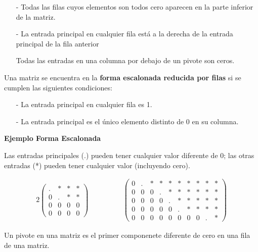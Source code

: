\documentclass{article}
\begin{document}
\begin{tcolorbox}[colback=blue!10!white,colframe=blue!60!black,title=Propiedades de la Forma Escalonada]
    \begin{itemize}
        \item[-] Todas las filas cuyos elementos son todos cero aparecen en la parte inferior de la matriz.
        \item[-] La entrada principal en cualquier fila está a la derecha de la entrada principal de la fila anterior
        \item[] Todas las entradas en una columna por debajo de un pivote son ceros.
    \end{itemize}   
    Una matriz se encuentra en la \textbf{forma escalonada reducida por filas} si se cumplen las siguientes condiciones:
    \begin{itemize}
        \item[-] La entrada principal en cualquier fila es 1.
        \item[-] La entrada principal es el único elemento distinto de 0 en su columna.
    \end{itemize}    
\end{tcolorbox}

\begin{large}
    \textbf{Ejemplo Forma Escalonada}
\end{large}

Las entradas principales (.) pueden tener cualquier valor diferente de 0; las otras entradas (*) pueden tener cualquier valor (incluyendo cero).

\begin{alignat*}{2}
    \begin{pmatrix}
        .&*&*&*\\
        0&.&*&*\\
        0&0&0&0\\
        0&0&0&0
    \end{pmatrix}
    & \hspace{ 4em}%
    \begin{pmatrix}
        0&.&*&*&*&*&*&*&*&*\\
        0&0&0&.&*&*&*&*&*&*\\
        0&0&0&0&.&*&*&*&*&*\\
        0&0&0&0&0&.&*&*&*&*\\
        0&0&0&0&0&0&0&0&.&*
    \end{pmatrix}
\end{alignat*}

\begin{tcolorbox}[colback=green!20!white,colframe=green!80!black,title=Pivote]
    Un pivote en una matriz es el primer componenete diferente de cero en una fila de una matriz.
\end{tcolorbox}
\end{document}
